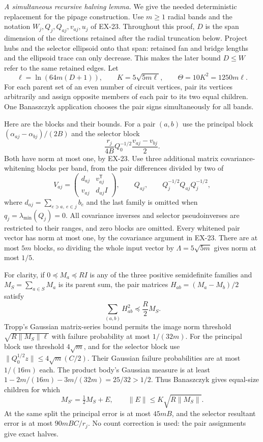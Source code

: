 \emph{A simultaneous recursive halving lemma.}
We give the needed deterministic replacement for the pipage
construction. Use $m\ge1$ radial bands and the notation
$W_j,Q_j,Q_{aj},v_{aj},u_j$ of EX-23. Throughout this proof,
$D$ is the span dimension of the directions retained after the
radial truncation below. Project hubs and the selector ellipsoid
onto that span: retained fan and bridge lengths and the
ellipsoid trace can only decrease. This makes the later bound
$D\le W$ refer to the same retained edges. Let
\[
 \ell=\ln(64m(D+1)),\qquad K=5\sqrt{5m\ell},
 \qquad \Theta=10K^2=1250m\ell.
\]
For each parent set of an even number of circuit vertices,
pair its vertices arbitrarily and assign opposite members of
each pair to its two equal children. One Banaszczyk application
chooses the pair signs simultaneously for all bands.

Here are the blocks and their bounds. For a pair $(a,b)$ use
the principal block $(\alpha_{aj}-\alpha_{bj})/(2B)$ and
the selector block
\[
 \frac{r_j}{4B}Q_0^{-1/2}\frac{v_{aj}-v_{bj}}2.
\]
Both have norm at most one, by EX-23. Use three additional
matrix covariance-whitening blocks per band, from the pair
differences divided by two of
\[
 V_{aj}=\begin{pmatrix}d_{aj}&v_{aj}^{\mathsf T}\\
                      v_{aj}&d_{aj}I\end{pmatrix},
 \qquad Q_{aj},\qquad Q_j^{-1/2}Q_{aj}Q_j^{-1/2},
 \tag{EX29.3}
\]
where $d_{aj}=\sum_{e\ni a,\ e\in j}b_e$ and the last
family is omitted when $q_j=\lambda_{\min}(Q_j)=0$.
All covariance inverses and selector pseudoinverses are restricted
to their ranges, and zero blocks are omitted. Every whitened
pair vector has norm at most one, by the covariance argument
in EX-23. There are at most $5m$ blocks, so dividing the whole
input vector by $\Lambda=5\sqrt{5m}$ gives norm at most $1/5$.

For clarity, if $0\preceq M_a\preceq RI$ is any of the three
positive semidefinite families and $M_S=\sum_{a\in S}M_a$
is its parent sum, the pair matrices $H_{ab}=(M_a-M_b)/2$
satisfy
\[
 \sum_{(a,b)}H_{ab}^2\preceq\frac R2 M_S.
\]
Tropp's Gaussian matrix-series bound permits the image norm
threshold $\sqrt{R\|M_S\|\ell}$ with failure probability at
most $1/(32m)$. For the principal block use threshold
$4\sqrt m$, and for the selector block use
$\|Q_0^{1/2}z\|\le4\sqrt m(C/2)$.
Their Gaussian failure probabilities are at most $1/(16m)$
each. The product body's Gaussian measure is at least
$1-2m/(16m)-3m/(32m)=25/32>1/2$.
Thus Banaszczyk gives equal-size children for which
\[
 M_{S'}=\tfrac12M_S+E,\qquad
 \|E\|\le K\sqrt{R\|M_S\|}.
 \tag{EX29.4}
\]
At the same split the principal error is at most $45mB$,
and the selector resultant error is at most $90mBC/r_j$.
No count correction is used: the pair assignments give exact
halves.

